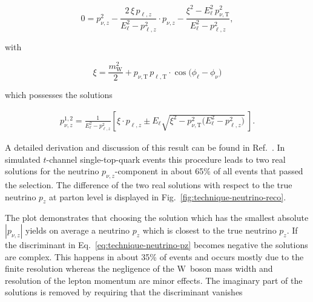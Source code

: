 \begin{equation}
0=p_{\nu,z}^2-\frac{2\,\xi\,p_{\ell,z}}{E_{\ell}^{2}-p_{\ell,z}^2}\cdot p_{\nu,z}-\frac{\xi^{2}-E_{\ell}^{2}\,p_{\nu,\mathrm{T}}^2}{E_{\ell}^{2}-p_{\ell,z}^2},\end{equation}

with

\begin{equation}
\xi=\frac{m_\mathrm{W}^2}{2}+p_{\nu,\mathrm{T}}\,p_{\ell,\mathrm{T}}\cdot\cos\big(\phi_\ell-\phi_\nu\big)
\end{equation}

which possesses the solutions

\begin{align}
p_{\nu,z}^{1,2}=\frac{1}{E_{\ell}^{2}-p_{\ell,z}^{2}}\left[\xi\cdot p_{\ell,z}\pm E_{\ell} \sqrt{\xi^2-p_{\nu,\mathrm{T}}^2\big(E_{\ell}^2-p_{\ell,z}^2\big)}~\right]. \label{eq:technique-neutrino-pz}
\end{align}

A detailed derivation and discussion of this result can be found in Ref.~\cite{Chwalek:1416031}. In simulated $t$-channel single-top-quark events this procedure leads to two real solutions for the neutrino $p_{\nu,z}$-component in about 65\% of all events that passed the selection. The difference of the two real solutions with respect to the true neutrino $p_{z}$ at parton level is displayed in Fig.~\ref{fig:technique-neutrino-reco}. 


The plot demonstrates that choosing the solution which has the smallest absolute $|p_{\nu,z}|$ yields on average a neutrino $p_{z}$ which is closest to the true neutrino $p_{z}$. If the discriminant in Eq.~\ref{eq:technique-neutrino-pz} becomes negative the solutions are complex. This happens in about 35\% of events and occurs mostly due to the finite \met resolution whereas the negligence of the W~boson mass width and resolution of the lepton momentum are minor effects. The imaginary part of the solutions is removed by requiring that the discriminant vanishes

